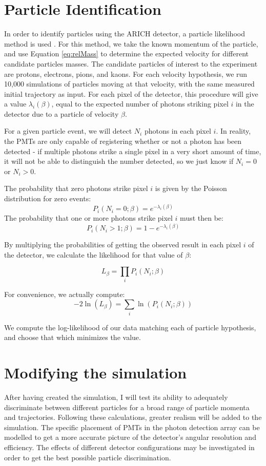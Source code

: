 \section{Particle Identification}
\label{sec:particleIdentification}
In order to identify particles using the \ac{ARICH} detector, a particle likelihood method is used \cite{richImpact, belleArich}. For this method, we take the known momentum of the particle, and use Equation \ref{eq:relMass} to determine the expected velocity for different candidate particles masses. The candidate particles of interest to the experiment are protons, electrons, pions, and kaons. For each velocity hypothesis, we run 10,000 simulations of particles moving at that velocity, with the same measured initial trajectory as input. For each pixel of the detector, this procedure will give a value $\lambda_i(\beta)$, equal to the expected number of photons striking pixel $i$ in the detector due to a particle of velocity $\beta$. 

For a given particle event, we will detect $N_i$ photons in each pixel $i$. In reality, the PMTs are only capable of registering whether or not a photon has been detected - if multiple photons strike a single pixel in a very short amount of time, it will not be able to distinguish the number detected, so we just know if $N_i = 0$ or $N_i > 0$.

The probability that zero photons strike pixel $i$ is given by the Poisson distribution for zero events:
$$ P_i(N_i=0; \beta) = e^{-\lambda_i(\beta)} $$
 The probability that one or more photons strike pixel $i$ must then be:
$$ P_i(N_i>1; \beta) = 1 - e^{-\lambda_i(\beta)} $$

By multiplying the probabilities of getting the observed result in each pixel $i$ of the detector, we calculate the likelihood for that value of $\beta$:

$$L_\beta = \prod_{i}P_i(N_i; \beta)$$

For convenience, we actually compute:
\begin{equation}
    \label{eq:loglikelihood}
    -2\ln(L_\beta) = \sum_i \ln(P_i(N_i; \beta))
\end{equation}


We compute the log-likelihood of our data matching each of particle hypothesis, and choose that which minimizes the value.

\section{Modifying the simulation}
After having created the simulation, I will test its ability to adequately discriminate between different particles for a broad range of particle momenta and trajectories. Following these calculations, greater realism will be added to the simulation. The specific placement of PMTs in the photon detection array can be modelled to get a more accurate picture of the detector's angular resolution and efficiency. The effects of different detector configurations may be investigated in order to get the best possible particle discrimination. 

